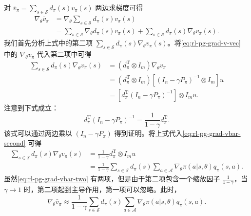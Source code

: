 \begin{note}
\label{box:rl-pg-9-4}
对 $\bar{v}_{\pi} = \sum_{s\in \mathcal{S}}d_{\pi}(s)v_{\pi}(s)$ 两边求梯度可得
\begin{equation}
\begin{aligned}
\nabla_{\theta} \bar{v}_{\pi} &= \nabla_{\theta} \sum_{s \in \mathcal{S}} d_{\pi}(s) v_{\pi}(s) \\
&= \sum_{s \in \mathcal{S}} \nabla_{\theta} d_{\pi}(s) v_{\pi}(s) + \sum_{s \in \mathcal{S}} d_{\pi}(s) \nabla_{\theta} v_{\pi}(s).
\end{aligned}
\label{eq:rl-pg-grad-vbar-two}
\end{equation}
我们首先分析上式中的第二项 $\sum_{s\in \mathcal{S}}d_{\pi}(s)\nabla_{\theta}v_{\pi}(s)$。将\cref{eq:rl-pg-grad-v-vec} 中的 $\nabla_{\theta}v_{\pi}$ 代入第二项中可得
\begin{equation}
\begin{aligned}
\sum_{s \in \mathcal{S}} d_{\pi}(s) \nabla_{\theta} v_{\pi}(s) &= (d_{\pi}^{\mathrm{T}} \otimes I_m) \nabla_{\theta} v_{\pi} \\
&= (d_{\pi}^{\mathrm{T}} \otimes I_m) \left[(I_n - \gamma P_{\pi})^{-1} \otimes I_m\right] u \\
&= \left[ d_{\pi}^{\mathrm{T}} (I_n - \gamma P_{\pi})^{-1} \right] \otimes I_m u.
\end{aligned}
\label{eq:rl-pg-grad-vbar-second}
\end{equation}
注意到下式成立：
\begin{equation}
d_{\pi}^{\mathrm{T}} (I_n - \gamma P_{\pi})^{-1} = \frac{1}{1 - \gamma} d_{\pi}^{\mathrm{T}}.
\end{equation}
该式可以通过两边乘以 $(I_n - \gamma P_{\pi})$ 得到证明。将上式代入\cref{eq:rl-pg-grad-vbar-second} 可得
\begin{equation}
\begin{aligned}
\sum_{s \in \mathcal{S}} d_{\pi}(s) \nabla_{\theta} v_{\pi}(s) &= \frac{1}{1 - \gamma} d_{\pi}^{\mathrm{T}} \otimes I_m u \\
&= \frac{1}{1 - \gamma} \sum_{s \in \mathcal{S}} d_{\pi}(s) \sum_{a \in \mathcal{A}} \nabla_{\theta} \pi(a|s,\theta) q_{\pi}(s,a).
\end{aligned}
\end{equation}
虽然\cref{eq:rl-pg-grad-vbar-two} 有两项，但是由于第二项包含一个缩放因子 $\frac{1}{1 - \gamma}$，当 $\gamma \to 1$ 时，第二项起到主导作用，第一项可以忽略。此时，
\begin{equation}
\nabla_{\theta} \bar{v}_{\pi} \approx \frac{1}{1 - \gamma} \sum_{s \in \mathcal{S}} d_{\pi}(s) \sum_{a \in \mathcal{A}} \nabla_{\theta} \pi(a|s,\theta) q_{\pi}(s,a).

\end{equation}
\end{note}
